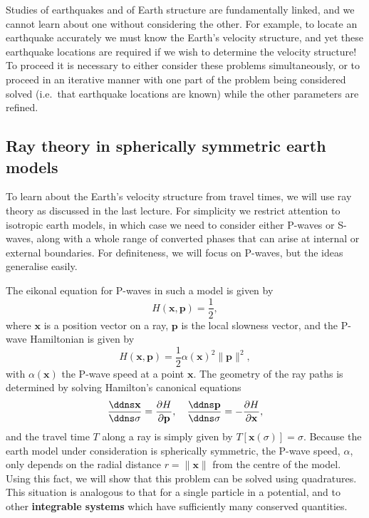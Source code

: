 Studies of earthquakes and of Earth structure are fundamentally linked, and we cannot learn about one without considering the other.
 For example, to locate an earthquake accurately 
we must know the Earth's velocity structure, and yet these earthquake locations are required if we wish to determine the velocity 
structure! To proceed it is necessary to 
either consider these problems simultaneously, or to proceed in an iterative manner with one part of the problem being 
considered solved (i.e.\ that earthquake locations 
are known) while the other parameters are refined.

\subsection*{Ray theory in spherically symmetric earth models}

To learn about the Earth's velocity structure from travel times, we will use ray theory as discussed in the last lecture.
  For simplicity we restrict attention 
to isotropic earth models, in which case we need to consider either P-waves or S-waves, along with a whole
range of converted phases that can arise at internal or external boundaries. For definiteness, we will focus on P-waves, 
but the ideas generalise easily.

The eikonal equation for P-waves in such a model is given by
\begin{equation}
H(\mathbf{x},\mathbf{p})=\frac{1}{2},
\label{eq:3}
\end{equation}
where $\mathbf{x}$ is a position vector on a ray, $\mathbf{p}$ is the local slowness vector, and the P-wave Hamiltonian is given by
\begin{equation}
H(\mathbf{x},\mathbf{p})=\frac{1}{2}\alpha(\mathbf{x})^{2}\|\mathbf{p}\|^{2},
\label{eq:4}
\end{equation}
with $\alpha(\mathbf{x})$ the P-wave speed at a point $\mathbf{x}$. The geometry of the ray paths is determined by solving Hamilton's canonical equations
\begin{equation}
\frac{\ddns \mathbf{x}}{\ddns \sigma}=\frac{\partial H}{\partial \mathbf{p}},\quad \frac{\ddns \mathbf{p}}{\ddns \sigma}=-\frac{\partial H}{\partial \mathbf{x}},
\label{eq:5}
\end{equation}
and the travel time $T$ along a ray is simply given by $T[\mathbf{x}(\sigma)]=\sigma$. Because the earth model under 
consideration is spherically symmetric, the P-wave speed, 
$\alpha$, only depends on the radial distance $r=\|\mathbf{x}\|$ from the centre of the model. Using this fact, we will show that 
this problem can be solved using quadratures. 
This situation is analogous to that for a single particle in a potential, and to other \textbf{integrable systems}
 which have sufficiently many conserved quantities.


